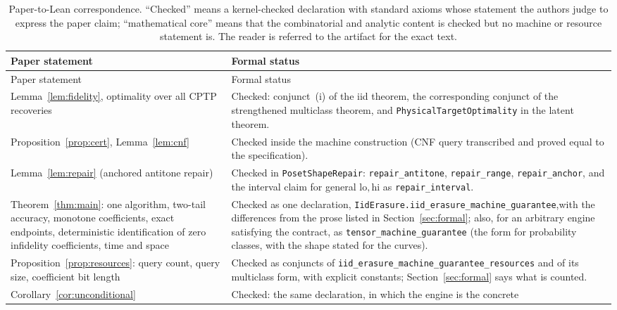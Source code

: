 \documentclass[11pt]{article}
\theoremstyle{remark}
\newcommand{\lean}[1]{\texttt{#1}}
\begin{document}
{\small
\begin{longtable}{@{}p{}p{}@{}}
\caption{Paper-to-Lean correspondence. ``Checked'' means a kernel-checked
declaration with standard axioms whose statement the authors judge to
express the paper claim; ``mathematical core'' means that the
combinatorial and analytic content is checked but no machine or resource
statement is. The reader is referred to the artifact for the exact
text.}\label{tab:correspondence}\\
\toprule
Paper statement & Formal status\\
\midrule
\endfirsthead
\toprule
Paper statement & Formal status\\
\midrule
\endhead
\bottomrule
\endfoot
Lemma~\ref{lem:fidelity}, optimality over all CPTP recoveries &
Checked: conjunct~(i) of the iid theorem, the corresponding conjunct of
the strengthened multiclass theorem, and
\lean{PhysicalTargetOptimality} in the latent theorem.\\
Proposition~\ref{prop:cert}, Lemma~\ref{lem:cnf} &
Checked inside the machine construction (CNF query transcribed and
proved equal to the specification).\\
Lemma~\ref{lem:repair} (anchored antitone repair) &
Checked in \lean{PosetShapeRepair}: \lean{repair\_antitone},
\lean{repair\_range}, \lean{repair\_anchor}, and the interval claim for
general
\(\mathrm{lo},\mathrm{hi}\) as \lean{repair\_interval}.\\
Theorem~\ref{thm:main}: one algorithm, two-tail accuracy, monotone
coefficients, exact endpoints, deterministic identification of zero
infidelity coefficients, time and space &
Checked as one declaration,\newline
\lean{IidErasure.iid\_erasure\_machine\_guarantee},\newline with the
differences from the prose listed in Section~\ref{sec:formal}; also, for
an arbitrary engine satisfying the contract, as
\lean{tensor\_machine\_guarantee} (the form for probability classes,
with the shape stated for the curves).\\
Proposition~\ref{prop:resources}: query count, query size, coefficient
bit length &
Checked as conjuncts of\newline
\lean{iid\_erasure\_machine\_guarantee\_resources}\newline
and of its multiclass
form, with explicit constants; Section~\ref{sec:formal} says what is
counted.\\
Corollary~\ref{cor:unconditional} &
Checked: the same declaration, in which the engine is the concrete

\end{longtable}}
\end{document}
